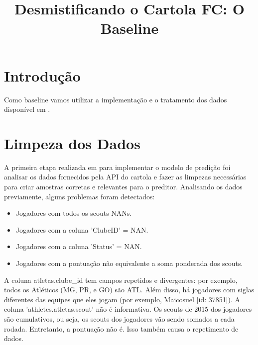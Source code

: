 \documentclass[conference]{IEEEtran}
\begin{document}
\title{Desmistificando o Cartola FC: O Baseline}

\author
{
  \and
  \and
  \and
}

\maketitle

\section{Introdução}

Como baseline vamos utilizar a implementação e o tratamento dos dados disponível em \cite{git_cartola}.


\section{Limpeza dos Dados}

A primeira etapa realizada em \cite{git_cartola} para implementar o modelo de predição foi analisar os dados fornecidos pela API do cartola e fazer as limpezas necessárias para criar amostras corretas e relevantes para o preditor. Analisando os dados previamente, alguns problemas foram detectados:

\begin{itemize}
	\item Jogadores com todos os scouts NANs.
	\item Jogadores com a coluna 'ClubeID' = NAN.
	\item Jogadores com a coluna 'Status' = NAN.
	\item Jogadores com a pontuação não equivalente a soma ponderada dos scouts.
\end{itemize}

A coluna  atletas.clube\_id tem campos repetidos e divergentes: por exemplo, todos os Atléticos (MG, PR, e GO) são ATL. Além disso, há jogadores com siglas diferentes das equipes que eles jogam (por exemplo, Maicosuel [id: 37851]).
A coluna 'athletes.atletas.scout' não é informativa.
Os scouts de 2015 dos jogadores são cumulativos, ou seja, os scouts dos jogadores vão sendo somados a cada rodada. Entretanto, a pontuação não é. Isso também causa o repetimento de dados.
\end{document}
